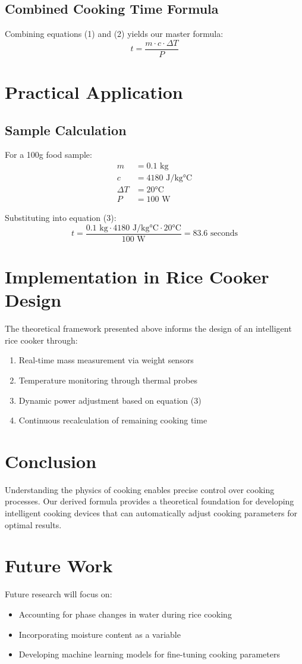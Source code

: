 \documentclass[12pt]{article}
\begin{document}
\subsection{Combined Cooking Time Formula}
Combining equations (1) and (2) yields our master formula:
\begin{equation}
t = \frac{m \cdot c \cdot \Delta T}{P}
\end{equation}

\section{Practical Application}
\subsection{Sample Calculation}
For a 100g food sample:
\begin{align*}
m &= 0.1 \text{ kg}\\
c &= 4180 \text{ J/kg°C}\\
\Delta T &= 20\text{°C}\\
P &= 100 \text{ W}
\end{align*}

Substituting into equation (3):
\begin{equation}
t = \frac{0.1 \text{ kg} \cdot 4180 \text{ J/kg°C} \cdot 20\text{°C}}{100 \text{ W}} = 83.6 \text{ seconds}
\end{equation}

\section{Implementation in Rice Cooker Design}
The theoretical framework presented above informs the design of an intelligent rice cooker through:
\begin{enumerate}
    \item Real-time mass measurement via weight sensors
    \item Temperature monitoring through thermal probes
    \item Dynamic power adjustment based on equation (3)
    \item Continuous recalculation of remaining cooking time
\end{enumerate}

\section{Conclusion}
Understanding the physics of cooking enables precise control over cooking processes. Our derived formula provides a theoretical foundation for developing intelligent cooking devices that can automatically adjust cooking parameters for optimal results.

\section{Future Work}
Future research will focus on:
\begin{itemize}
    \item Accounting for phase changes in water during rice cooking
    \item Incorporating moisture content as a variable
    \item Developing machine learning models for fine-tuning cooking parameters
\end{itemize}
\end{document}
